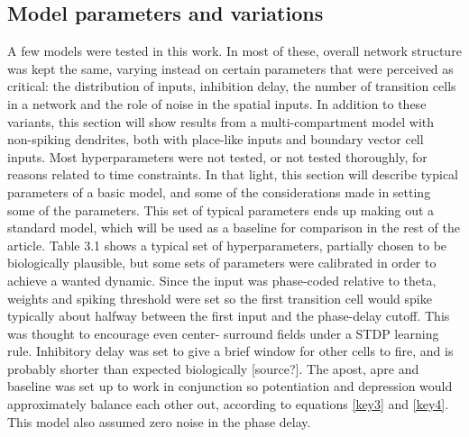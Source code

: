 \documentclass{article}
\begin{document}
    \subsection{Model parameters and variations}
    A few models were tested in this work. In most of these, overall network structure was kept the same, varying instead on certain parameters that were perceived as critical: the distribution of inputs, inhibition delay, the number of transition cells in a network and the role of noise in the spatial inputs. In addition to these variants, this section will show results from a multi-compartment model with non-spiking dendrites, both with place-like inputs and boundary vector cell inputs. Most hyperparameters were not tested, or not tested thoroughly, for reasons related to time constraints. In that light, this section will describe typical parameters of a basic model, and some of the considerations made in setting some of the parameters. This set of typical parameters ends up making out a standard model, which will be used as a baseline for comparison in the rest of the article.
    Table 3.1 shows a typical set of hyperparameters, partially chosen to be biologically plausible, but some sets of parameters were calibrated in order to achieve a wanted dynamic. Since the input was phase-coded relative to theta, weights and spiking threshold were set so the first transition cell would spike typically about halfway between the first input and the phase-delay cutoff. This was thought to encourage even center- surround fields under a STDP learning rule. Inhibitory delay was set to give a brief window for other cells to fire, and is probably shorter than expected biologically [source?]. The apost, apre and baseline was set up to work in conjunction so potentiation and depression would approximately balance each other out, according to equations \ref{key3} and \ref{key4}. This model also assumed zero noise in the phase delay.
\end{document}
